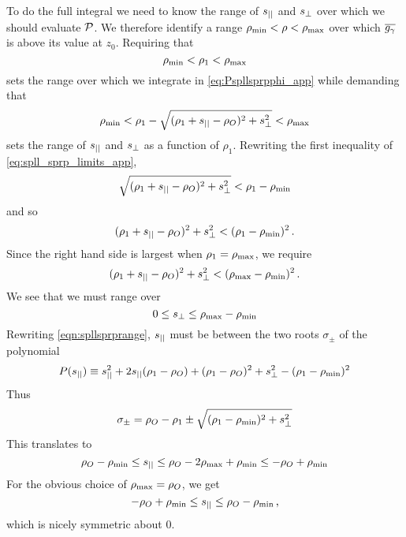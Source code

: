 \documentclass[fleqn,usenatbib]{mnras}
\begin{document}
    To do the full integral we need to know the range of $s_{||}$ and $s_{\perp}$
    over which we should evaluate $\mathcal{P}$.  We therefore identify a range
    $\rho_{\rm min}<\rho<\rho_{\rm max}$ over which $\overline{g_\gamma}$ is above its
    value at $z_0$.  Requiring that
    \begin{equation}
        \rho_{\rm min} < \rho_1 < \rho_{\rm max}
    \end{equation}
    sets the range over which we integrate in \autoref{eq:Pspllsprpphi_app}
    while demanding that
    \begin{equation}
        \label{eq:spll_sprp_limits_app}
        \rho_{\rm min} < \rho_1 - \sqrt{(\rho_1+s_{||}-\rho_O)^2+ s_{\perp}^2} < \rho_{\rm max}
    \end{equation}
    sets the range of $s_{||}$ and $s_{\perp}$ as a function of $\rho_1$.  Rewriting
    the first inequality of \autoref{eq:spll_sprp_limits_app},
    \begin{equation}
        \sqrt{(\rho_1+s_{||}-\rho_O)^2+ s_{\perp}^2} < \rho_1-\rho_{\rm min}
    \end{equation}
    and so
    \begin{equation}
    \label{eqn:spllsprprange}
        (\rho_1+s_{||}-\rho_O)^2+ s_{\perp}^2 < (\rho_1-\rho_{\rm min})^2 \,.
    \end{equation}
    Since the right hand side is largest when $\rho_1=\rho_{\rm max}$, we
    require
    \begin{equation}
        (\rho_1+s_{||}-\rho_O)^2+ s_{\perp}^2 < (\rho_{\rm max}-\rho_{\rm min})^2 \,.
    \end{equation}
    We see that we must range over
    \begin{equation}
         0 \leq s_{\perp} \leq \rho_{\rm max}-\rho_{\rm min}
    \end{equation}
    Rewriting \autoref{eqn:spllsprprange}, $s_{||}$ must be between the two roots
    $\sigma_\pm$ of the polynomial
    \begin{equation}
        P(s_{||}) \equiv
        s_{||}^2+2s_{||}(\rho_1-\rho_O) + (\rho_1-\rho_O)^2 + s_{\perp}^2 - (\rho_1-\rho_{\rm min})^2
        \nonumber
    \end{equation}
    Thus
    \begin{equation}
        \sigma_\pm =
         \rho_O-\rho_1 \pm
         \sqrt{(\rho_1-\rho_{\rm min})^2 + s_{\perp}^2}
    \end{equation}
    This translates to
    \begin{equation}
        \rho_O-\rho_{\rm min} \leq
        s_{||}
        \leq
        \rho_O-2\rho_{\rm max}+\rho_{\rm min}
        \leq
        -\rho_O+\rho_{\rm min}
    \end{equation}
    For the obvious choice of $\rho_{\rm max}=\rho_O$, we get
    \begin{equation}
        -\rho_O + \rho_{\rm min} \leq s_{||}  \leq \rho_O - \rho_{\rm min} \,,
    \end{equation}
    which is nicely symmetric about $0$.
\end{document}
